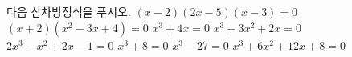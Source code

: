 다음 삼차방정식을 푸시오.
 $(x-2)(2x-5)(x-3)=0$
 $(x+2)(x^2-3x+4)=0$
 $x^3+4x=0$
 $x^3+3x^2+2x=0$
 $2x^3-x^2+2x-1=0$
 $x^3+8=0$
 $x^3-27=0$
 $x^3+6x^2+12x+8=0$
